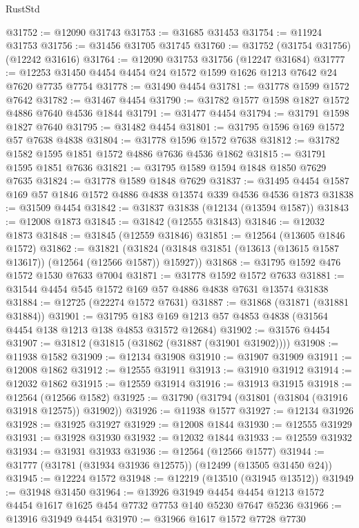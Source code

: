 \begin{lexlean}{RustStd}
\begin{coremodule}
{\begin{coremodule}
{{{{{{{{{{{{{{{{{{{{{{{{{{{{{{{{{{{{{{{{{{{{{{{{{{{{{{{{{{{{{{{{{{{{{{{{{{{{{{{{@31752 := @12090 @31743
@31753 := @31685 @31453
@31754 := @11924 @31753
@31756 := @31456 @31705 @31745
@31760 := @31752 (@31754 @31756) (@12242 @31616)
@31764 := @12090 @31753 @31756 (@12247 @31684)
@31777 := @12253 @31450 @4454 @4454 @24 @1572 @1599 @1626 @1213 @7642 @24 @7620 @7735 @7754
@31778 := @31490 @4454
@31781 := @31778 @1599 @1572 @7642
@31782 := @31467 @4454
@31790 := @31782 @1577 @1598 @1827 @1572 @4886 @7640 @4536 @1844
@31791 := @31477 @4454
@31794 := @31791 @1598 @1827 @7640
@31795 := @31482 @4454
@31801 := @31795 @1596 @169 @1572 @57 @7638 @4838
@31804 := @31778 @1596 @1572 @7638
@31812 := @31782 @1582 @1595 @1851 @1572 @4886 @7636 @4536 @1862
@31815 := @31791 @1595 @1851 @7636
@31821 := @31795 @1589 @1594 @1848 @1850 @7629 @7635
@31824 := @31778 @1589 @1848 @7629
@31837 := @31495 @4454 @1587 @169 @57 @1846 @1572 @4886 @4838 @13574 @339 @4536 @4536 @1873
@31838 := @31509 @4454
@31842 := @31837 @31838 (@12134 (@13594 @1587))
@31843 := @12008 @1873
@31845 := @31842 (@12555 @31843)
@31846 := @12032 @1873
@31848 := @31845 (@12559 @31846)
@31851 := @12564 (@13605 @1846 @1572)
@31862 := @31821
    (@31824 (@31848 @31851 (@13613 (@13615 @1587 @13617)) (@12564 (@12566 @1587)) @15927))
@31868 := @31795 @1592 @476 @1572 @1530 @7633 @7004
@31871 := @31778 @1592 @1572 @7633
@31881 := @31544 @4454 @545 @1572 @169 @57 @4886 @4838 @7631 @13574 @31838
@31884 := @12725 (@22274 @1572 @7631)
@31887 := @31868 (@31871 (@31881 @31884))
@31901 := @31795 @183 @169 @1213 @57 @4853 @4838 (@31564 @4454 @138 @1213 @138 @4853 @31572 @12684)
@31902 := @31576 @4454
@31907 := @31812 (@31815 (@31862 (@31887 (@31901 @31902))))
@31908 := @11938 @1582
@31909 := @12134 @31908
@31910 := @31907 @31909
@31911 := @12008 @1862
@31912 := @12555 @31911
@31913 := @31910 @31912
@31914 := @12032 @1862
@31915 := @12559 @31914
@31916 := @31913 @31915
@31918 := @12564 (@12566 @1582)
@31925 := @31790 (@31794 (@31801 (@31804 (@31916 @31918 @12575)) @31902))
@31926 := @11938 @1577
@31927 := @12134 @31926
@31928 := @31925 @31927
@31929 := @12008 @1844
@31930 := @12555 @31929
@31931 := @31928 @31930
@31932 := @12032 @1844
@31933 := @12559 @31932
@31934 := @31931 @31933
@31936 := @12564 (@12566 @1577)
@31944 := @31777 (@31781 (@31934 @31936 @12575)) (@12499 (@13505 @31450 @24))
@31945 := @12224 @1572
@31948 := @12219 (@13510 (@31945 @13512))
@31949 := @31948 @31450
@31964 := @13926
    @31949
    @4454
    @4454
    @1213
    @1572
    @4454
    @1617
    @1625
    @454
    @7732
    @7753
    @140
    @5230
    @7647
    @5236
@31966 := @13916 @31949 @4454
@31970 := @31966 @1617 @1572 @7728 @7730
}}}}}}}}}}}}}}}}}}}}}}}}}}}}}}}}}}}}}}}}}}}}}}}}}}}}}}}}}}}}}}}}}}}}}}}}}}}}}}}}
\end{coremodule}}
\end{coremodule}
\end{lexlean}
